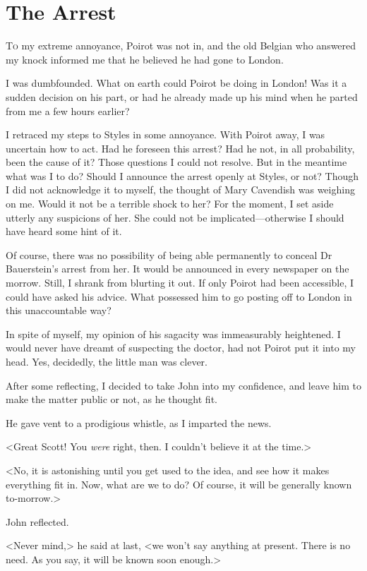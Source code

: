 \chapter{The Arrest} 

\lettrine{T}{o} my extreme annoyance, Poirot was not in, and the old Belgian who answered my knock informed me that he believed he had gone to London. 

\zz
 I was dumbfounded. What on earth could Poirot be doing in London! Was it a sudden decision on his part, or had he already made up his mind when he parted from me a few hours earlier? 

 I retraced my steps to Styles in some annoyance. With Poirot away, I was uncertain how to act. Had he foreseen this arrest? Had he not, in all probability, been the cause of it? Those questions I could not resolve. But in the meantime what was I to do? Should I announce the arrest openly at Styles, or not? Though I did not acknowledge it to myself, the thought of Mary Cavendish was weighing on me. Would it not be a terrible shock to her? For the moment, I set aside utterly any suspicions of her. She could not be implicated—otherwise I should have heard some hint of it. 

 Of course, there was no possibility of being able permanently to conceal Dr Bauerstein's arrest from her. It would be announced in every newspaper on the morrow. Still, I shrank from blurting it out. If only Poirot had been accessible, I could have asked his advice. What possessed him to go posting off to London in this unaccountable way? 

 In spite of myself, my opinion of his sagacity was immeasurably heightened. I would never have dreamt of suspecting the doctor, had not Poirot put it into my head. Yes, decidedly, the little man was clever. 

 After some reflecting, I decided to take John into my confidence, and leave him to make the matter public or not, as he thought fit. 

 He gave vent to a prodigious whistle, as I imparted the news. 

 <Great Scott! You \textit{were} right, then. I couldn't believe it at the time.> 

 <No, it is astonishing until you get used to the idea, and see how it makes everything fit in. Now, what are we to do? Of course, it will be generally known to-morrow.> 

 John reflected. 

 <Never mind,> he said at last, <we won't say anything at present. There is no need. As you say, it will be known soon enough.> 

